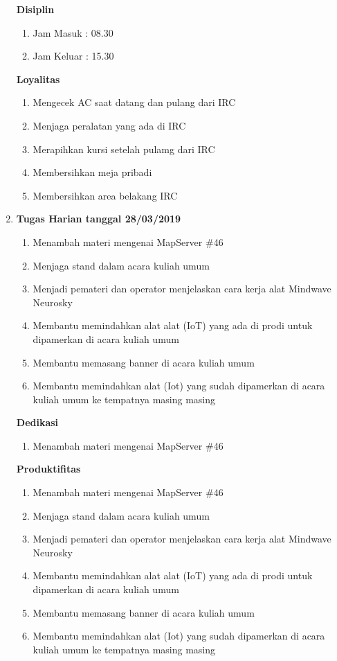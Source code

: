 \begin{enumerate}
\textbf{Disiplin}
\begin{enumerate}
\item Jam Masuk : 08.30
\item Jam Keluar : 15.30
\end{enumerate}

\textbf{Loyalitas}
\begin{enumerate}
\item Mengecek AC saat datang dan pulang dari IRC
\item Menjaga peralatan yang ada di IRC
\item Merapihkan kursi setelah pulamg dari IRC
\item Membersihkan meja pribadi
\item Membersihkan area belakang IRC
\end{enumerate}

\item \textbf{Tugas Harian tanggal 28/03/2019}
\begin{enumerate}
\item Menambah materi mengenai MapServer \#46
\item Menjaga stand dalam acara kuliah umum 
\item Menjadi pemateri dan operator menjelaskan cara kerja alat Mindwave Neurosky
\item Membantu memindahkan alat alat (IoT) yang ada di prodi untuk dipamerkan di acara kuliah umum
\item Membantu memasang banner di acara kuliah umum
\item Membantu memindahkan alat (Iot) yang sudah dipamerkan di acara kuliah umum ke tempatnya masing masing
\end{enumerate}

\textbf{Dedikasi}
\begin{enumerate}
\item Menambah materi mengenai MapServer \#46
\end{enumerate}

\textbf{Produktifitas}
\begin{enumerate}
\item Menambah materi mengenai MapServer \#46
\item Menjaga stand dalam acara kuliah umum 
\item Menjadi pemateri dan operator menjelaskan cara kerja alat Mindwave Neurosky
\item Membantu memindahkan alat alat (IoT) yang ada di prodi untuk dipamerkan di acara kuliah umum
\item Membantu memasang banner di acara kuliah umum
\item Membantu memindahkan alat (Iot) yang sudah dipamerkan di acara kuliah umum ke tempatnya masing masing
\end{enumerate}


\end{enumerate}
